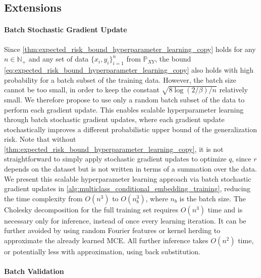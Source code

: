 \documentclass[runningheads, envcountsame, a4paper]{llncs}
\begin{document}
		\subsection{Extensions}
		\label{sec:extensions}
		
			\paragraph{Batch Stochastic Gradient Update}
			
				Since \cref{thm:expected_risk_bound_hyperparameter_learning_copy} holds for any $n \in \mathbb{N}_{+}$ and any set of data $\{x_{i}, y_{i}\}_{i = 1}^{n}$ from $\mathbb{P}_{X Y}$, the bound \eqref{eq:expected_risk_bound_hyperparameter_learning_copy} also holds with high probability for a batch subset of the training data. However, the batch size cannot be too small, in order to keep the constant $\sqrt{8 \log{(2 / \beta)} / n}$ relatively small. We therefore propose to use only a random batch subset of the data to perform each gradient update. This enables scalable hyperparameter learning through batch stochastic gradient updates, where each gradient update stochastically improves a different probabilistic upper bound of the generalization risk. Note that without \cref{thm:expected_risk_bound_hyperparameter_learning_copy}, it is not straightforward to simply apply stochastic gradient updates to optimize $q$, since $r$ depends on the dataset but is not written in terms of a summation over the data. We present this scalable hyperparameter learning approach via batch stochastic gradient updates in \cref{alg:multiclass_conditional_embedding_training}, reducing the time complexity from $O(n^{3})$ to $O(n_{b}^{3})$, where $n_{b}$ is the batch size. The Cholesky decomposition for the full training set requires $O(n^{3})$ time and is necessary only for inference, instead of once every learning iteration. It can be further avoided by using random Fourier features \citep{rahimi2008random} or kernel herding \citep{chen2010super} to approximate the already learned \gls{MCE}. All further inference takes $O(n^{2})$ time, or potentially less with approximation, using back substitution. 
	
			\paragraph{Batch Validation}
			
\end{document}
